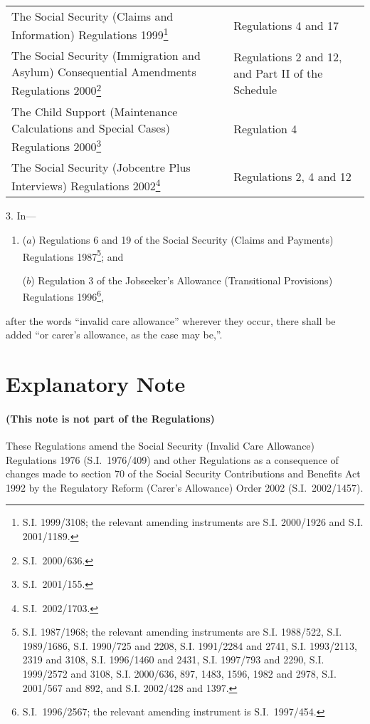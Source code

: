 \documentclass[12pt,a4paper]{article}
\begin{document}
{\begin{longtable}{p{204.69023pt}p{161.3082pt}}
The Social Security (Claims and Information) Regulations 1999\footnote{\frenchspacing S.I. 1999/3108; the relevant amending instruments are S.I. 2000/1926 and S.I. 2001/1189.}	&Regulations 4 and 17\\
The Social Security (Immigration and Asylum) Consequential Amendments Regulations 2000\footnote{S.I.\ 2000/636.}	&Regulations 2 and 12, and Part II of the Schedule\\
The Child Support (Maintenance Calculations and Special Cases) Regulations 2000\footnote{S.I.\ 2001/155.}	&Regulation 4\\
The Social Security (Jobcentre Plus Interviews) Regulations 2002\footnote{S.I.\ 2002/1703.}	&Regulations 2, 4 and 12\\
\end{longtable}

}

3.  In—
\begin{enumerate}\item[]
($a$) Regulations 6 and 19 of the Social Security (Claims and Payments) Regulations 1987\footnote{\frenchspacing S.I. 1987/1968; the relevant amending instruments are S.I. 1988/522, S.I. 1989/1686, S.I. 1990/725 and 2208, S.I. 1991/2284 and 2741, S.I. 1993/2113, 2319 and 3108, S.I. 1996/1460 and 2431, S.I. 1997/793 and 2290, S.I. 1999/2572 and 3108, S.I. 2000/636, 897, 1483, 1596, 1982 and 2978, S.I. 2001/567 and 892, and S.I. 2002/428 and 1397.}; and

($b$) Regulation 3 of the Jobseeker’s Allowance (Transitional Provisions) Regulations 1996\footnote{S.I.\ 1996/2567; the relevant amending instrument is S.I.\ 1997/454.},
\end{enumerate}
after the words “invalid care allowance” wherever they occur, there shall be added “or carer’s allowance, as the case may be,”. 

\vfill

\part{Explanatory Note}

\renewcommand\parthead{— Explanatory Note}

\subsection*{(This note is not part of the Regulations)}

These Regulations amend the Social Security (Invalid Care Allowance) Regulations 1976 (S.I.\ 1976/409) and other Regulations as a consequence of changes made to section 70 of the Social Security Contributions and Benefits Act 1992 by the Regulatory Reform (Carer’s Allowance) Order 2002 (S.I.\ 2002/1457).
\end{document}
